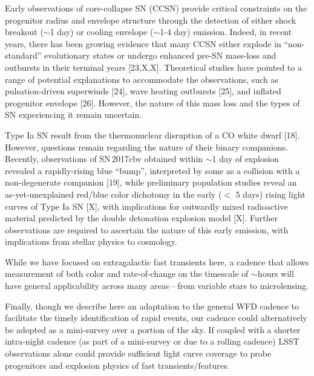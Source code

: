 \documentclass[12pt, letterpaper]{article}
\begin{document}
\smallskip
{} Early observations of core-collapse SN (CCSN) provide critical constraints on the progenitor radius and envelope structure through the detection of either shock breakout ($\sim$1 day) or cooling envelope ($\sim$1-4 day) emission. Indeed, in recent years, there has been growing evidence that many CCSN either explode in ``non-standard'' evolutionary states or undergo enhanced pre-SN mass-loss and outbursts in their terminal years [23,X,X]. Theoretical studies have pointed to a range of potential explanations to accommodate the observations, such as pulsation-driven superwinds [24], wave heating outbursts [25], and inflated progenitor envelope [26]. However, the nature of this mass loss and the types of SN experiencing it remain uncertain.



\smallskip
{}
Type Ia SN result from the thermonuclear disruption of a CO white dwarf [18]. However, questions remain regarding the nature of their binary companions. Recently, observations of SN\,2017cbv obtained within $\sim$1 day of explosion revealed a rapidly-rising blue ``bump'', interpreted by some as a collision with a non-degenerate companion [19], while preliminary population studies reveal an as-yet-unexplained red/blue color dichotomy in the early ($<$ 5 days) rising light curves of Type Ia SN [X], with implications for outwardly mixed radioactive material predicted by the double detonation explosion model [X]. Further observations are required to ascertain the nature of this early emission, with implications from stellar physics to cosmology. 




\smallskip
{} While we have focused on extragalactic fast transients here, a cadence that allows measurement of both color and rate-of-change on the timescale of $\sim$hours will have general applicability across many areas---from variable stars to microlensing.

\medskip
Finally, though we describe here an adaptation to the general WFD cadence to facilitate the timely identification of rapid events, our cadence could alternatively be adopted as a mini-survey over a portion of the sky. If coupled with a shorter intra-night cadence (as part of a mini-survey or due to a rolling cadence) LSST observations alone could provide sufficient light curve coverage to probe progenitors and explosion physics of fast transients/features.
\end{document}
